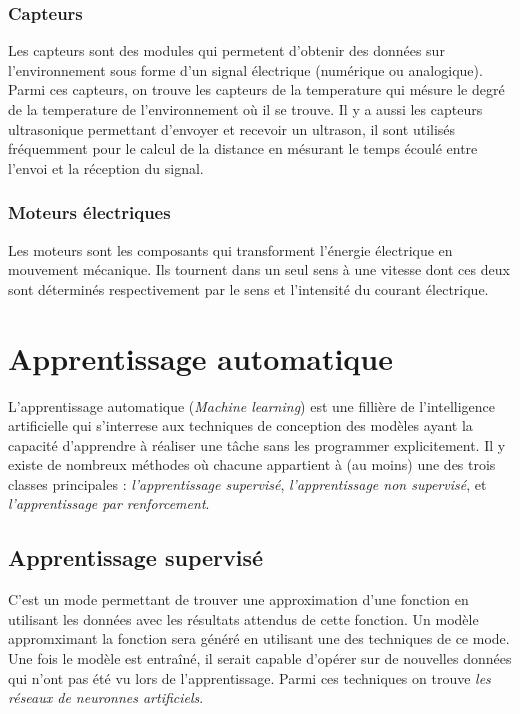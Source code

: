 \subsubsection{Capteurs}
Les capteurs sont des modules qui permetent d'obtenir des données sur
l'environnement sous forme d'un signal électrique (numérique ou analogique).
Parmi ces capteurs, on trouve les capteurs de la temperature qui mésure le degré
de la temperature de l'environnement où il se trouve. Il y a aussi les capteurs
ultrasonique permettant d'envoyer et recevoir un ultrason, il sont utilisés
fréquemment pour le calcul de la distance en mésurant le temps écoulé entre
l'envoi et la réception du signal.

\subsubsection{Moteurs électriques}
Les moteurs sont les composants qui transforment l'énergie électrique en
mouvement mécanique. Ils tournent dans un seul sens à une vitesse dont ces deux
sont déterminés respectivement par le sens et l'intensité du courant électrique.

\section{Apprentissage automatique}

L'apprentissage automatique (\emph{Machine learning}) est une fillière de
l'intelligence artificielle qui s'interrese aux techniques de conception des
modèles ayant la capacité d'apprendre à réaliser une tâche sans les programmer
explicitement. Il y existe de nombreux méthodes où chacune appartient à
(au moins) une des trois classes principales :
\emph{l'apprentissage supervisé}, \emph{l'apprentissage non supervisé}, et
\emph{l'apprentissage par renforcement}.

\subsection{Apprentissage supervisé}

C'est un mode permettant de trouver une approximation d'une fonction en utilisant
les données avec les résultats attendus de cette fonction. Un modèle appromximant
la fonction sera généré en utilisant une des techniques de ce mode. Une fois le
modèle est entraîné, il serait capable d'opérer sur de nouvelles données qui
n'ont pas été vu lors de l'apprentissage. Parmi ces techniques on trouve
\emph{les réseaux de neuronnes artificiels}.

